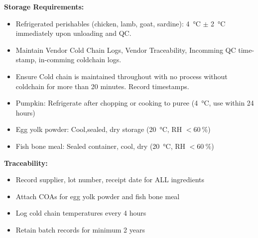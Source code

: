 \textbf{Storage Requirements:}
\begin{itemize}
\item Refrigerated perishables (chicken, lamb, goat, sardine): \SI{4}{\celsius} $\pm$ \SI{2}{\celsius} immediately upon unloading and QC.
\item Maintain Vendor Cold Chain Logs, Vendor Traceability, Incomming QC time-stamp, in-comming coldchain logs.
\item Ensure Cold chain is maintained throughout with no process without coldchain for more than 20 minutes. Record timestamps. 
\item Pumpkin: Refrigerate after chopping or cooking to puree (\SI{4}{\celsius}, use within 24 hours)
\item Egg yolk powder: Cool,sealed, dry storage (\SI{20}{\celsius}, RH $<\SI{60}{\percent}$)
\item Fish bone meal: Sealed container, cool, dry (\SI{20}{\celsius}, RH $<\SI{60}{\percent}$)

\end{itemize}

\textbf{Traceability:}
\begin{itemize}
\item Record supplier, lot number, receipt date for ALL ingredients
\item Attach COAs for egg yolk powder and fish bone meal
\item Log cold chain temperatures every 4 hours
\item Retain batch records for minimum 2 years
\end{itemize}